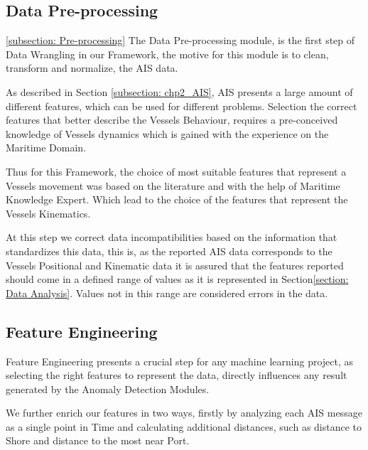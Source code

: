 \subsection{Data Pre-processing}
\ref{subsection: Pre-processing}
The Data Pre-processing module, is the first step of Data Wrangling in our Framework, the motive for this module is to clean, transform and normalize, the AIS data.

As described in Section \ref{subsection: chp2_AIS},  AIS presents a large amount of different features, which can be used for different problems. Selection the correct features that better describe the Vessels Behaviour,  requires a pre-conceived knowledge of Vessels dynamics which is gained with the experience on the Maritime Domain. 


Thus for this Framework, the choice of most suitable features that represent a Vessels movement was based on the literature and with the help of Maritime Knowledge Expert. Which lead to the choice of the features that represent the Vessels Kinematics.

At this step we correct data incompatibilities based on the information that standardizes this data, this is, as the reported AIS data corresponds to the Vessels Positional and Kinematic data it is assured that the features reported should come in a defined range of values as it is represented in Section\ref{section: Data Analysis}. Values not in this range are considered errors in the data. 



\subsection{Feature Engineering}
Feature Engineering presents a crucial step for any machine learning project, as selecting the right features to represent the data, directly influences any result generated by the Anomaly Detection Modules.  




We further enrich our features in two ways, firstly by analyzing each AIS message as a single point in Time and calculating additional distances, such as distance to Shore and distance to the most near Port.


